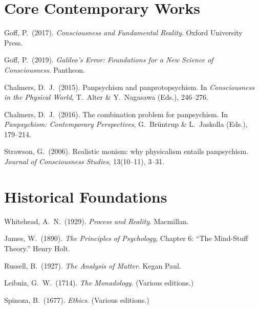 \documentclass[11pt,a4paper]{report}
\begin{document}
\section*{Core Contemporary Works}
\begin{enumerate}[label={[\arabic*]}, leftmargin=2.5em]
  \item Goff, P.\ (2017). \textit{Consciousness and Fundamental Reality}. Oxford University Press.
  \item Goff, P.\ (2019). \textit{Galileo's Error: Foundations for a New Science of Consciousness}. Pantheon.
  \item Chalmers, D.\ J.\ (2015). Panpsychism and panprotopsychism. In \textit{Consciousness in the Physical World}, T.\ Alter \& Y.\ Nagasawa (Eds.), 246--276.
  \item Chalmers, D.\ J.\ (2016). The combination problem for panpsychism. In \textit{Panpsychism: Contemporary Perspectives}, G.\ Br\"untrup \& L.\ Jaskolla (Eds.), 179--214.
  \item Strawson, G.\ (2006). Realistic monism: why physicalism entails panpsychism. \textit{Journal of Consciousness Studies}, 13(10--11), 3--31.
\end{enumerate}

\section*{Historical Foundations}
\begin{enumerate}[label={[\arabic*]}, leftmargin=2.5em, start=6]
  \item Whitehead, A.\ N.\ (1929). \textit{Process and Reality}. Macmillan.
  \item James, W.\ (1890). \textit{The Principles of Psychology}, Chapter 6: ``The Mind-Stuff Theory.'' Henry Holt.
  \item Russell, B.\ (1927). \textit{The Analysis of Matter}. Kegan Paul.
  \item Leibniz, G.\ W.\ (1714). \textit{The Monadology}. (Various editions.)
  \item Spinoza, B.\ (1677). \textit{Ethics}. (Various editions.)
\end{enumerate}
\end{document}
